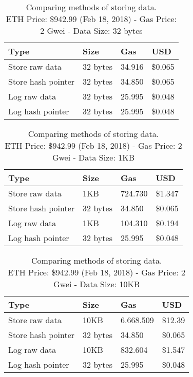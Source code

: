 \begin{table}[!htb]
  \centering
  \begin{tabular}{|l|l|l|l|}
  \hline
  Type & Size & Gas  & USD \\ \hline
  Store raw data & 32 bytes & 34.916  & \$0.065 \\ \hline
  Store hash pointer & 32 bytes & 34.850  & \$0.065 \\ \hline
  Log raw data & 32 bytes & 25.995  & \$0.048 \\ \hline
  Log hash pointer & 32 bytes & 25.995  & \$0.048 \\ \hline
  \end{tabular}
  \captionsetup{format=hang, justification=centering}
  \caption{Comparing methods of storing data.\\ ETH Price: \$942.99 (Feb 18, 2018) - Gas Price: 2 Gwei - Data Size: 32 bytes}
  \label{table:data_store_comparison_01}
\end{table}

\begin{table}[!htb]
  \centering
  \begin{tabular}{|l|l|l|l|}
  \hline
    Type & Size & Gas  & USD \\ \hline
    Store raw data & 1KB & 724.730  & \$1.347 \\ \hline
    Store hash pointer & 32 bytes & 34.850  & \$0.065 \\ \hline
    Log raw data & 1KB & 104.310  & \$0.194 \\ \hline
    Log hash pointer & 32 bytes & 25.995  & \$0.048 \\ \hline
  \end{tabular}
  \captionsetup{format=hang, justification=centering}
  \caption{Comparing methods of storing data.\\ ETH Price: \$942.99 (Feb 18, 2018) - Gas Price: 2 Gwei - Data Size: 1KB}
  \label{table:data_store_comparison_02}
\end{table}

\begin{table}[!htb]
  \centering
  \begin{tabular}{|l|l|l|l|}
    \hline
      Type & Size & Gas  & USD \\ \hline
      Store raw data & 10KB & 6.668.509  & \$12.39 \\ \hline
      Store hash pointer & 32 bytes & 34.850  & \$0.065 \\ \hline
      Log raw data & 10KB & 832.604  & \$1.547 \\ \hline
      Log hash pointer & 32 bytes & 25.995  & \$0.048 \\ \hline
  \end{tabular}
  \captionsetup{format=hang, justification=centering}
  \caption{Comparing methods of storing data.\\ ETH Price: \$942.99 (Feb 18, 2018) - Gas Price: 2 Gwei - Data Size: 10KB}
  \label{table:data_store_comparison_03}
\end{table}

